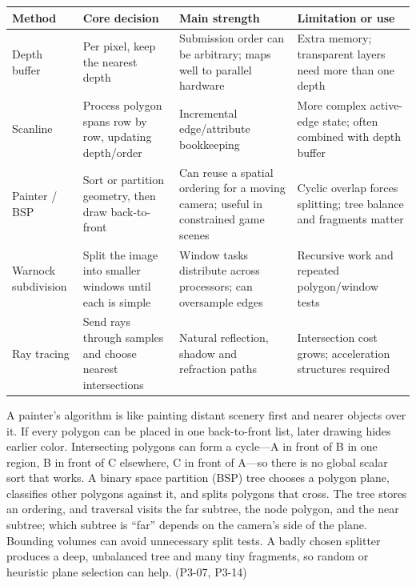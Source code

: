 {\def\LTcaptype{none} %
\begin{longtable}[]{@{}
  >{\raggedright\arraybackslash}p{}
  >{\raggedright\arraybackslash}p{}
  >{\raggedright\arraybackslash}p{}
  >{\raggedright\arraybackslash}p{}@{}}
\toprule\noalign{}
\begin{minipage}[b]{\linewidth}\raggedright
Method
\end{minipage} & \begin{minipage}[b]{\linewidth}\raggedright
Core decision
\end{minipage} & \begin{minipage}[b]{\linewidth}\raggedright
Main strength
\end{minipage} & \begin{minipage}[b]{\linewidth}\raggedright
Limitation or use
\end{minipage} \\
\midrule\noalign{}
\endhead
\bottomrule\noalign{}
\endlastfoot
Depth buffer & Per pixel, keep the nearest depth & Submission order can be arbitrary; maps well to parallel hardware & Extra memory; transparent layers need more than one depth \\
Scanline & Process polygon spans row by row, updating depth/order & Incremental edge/attribute bookkeeping & More complex active-edge state; often combined with depth buffer \\
Painter / BSP & Sort or partition geometry, then draw back-to-front & Can reuse a spatial ordering for a moving camera; useful in constrained game scenes & Cyclic overlap forces splitting; tree balance and fragments matter \\
Warnock subdivision & Split the image into smaller windows until each is simple & Window tasks distribute across processors; can oversample edges & Recursive work and repeated polygon/window tests \\
Ray tracing & Send rays through samples and choose nearest intersections & Natural reflection, shadow and refraction paths & Intersection cost grows; acceleration structures required \\
\end{longtable}
}

A painter's algorithm is like painting distant scenery first and nearer objects over it. If every polygon can be placed in one back-to-front list, later drawing hides earlier color. Intersecting polygons can form a cycle---A in front of B in one region, B in front of C elsewhere, C in front of A---so there is no global scalar sort that works. A binary space partition (BSP) tree chooses a polygon plane, classifies other polygons against it, and splits polygons that cross. The tree stores an ordering, and traversal visits the far subtree, the node polygon, and the near subtree; which subtree is ``far'' depends on the camera's side of the plane. Bounding volumes can avoid unnecessary split tests. A badly chosen splitter produces a deep, unbalanced tree and many tiny fragments, so random or heuristic plane selection can help. (P3-07, P3-14)

